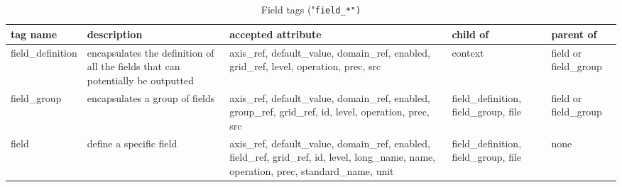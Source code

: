 \documentclass[../tex_main/NEMO_manual]{subfiles}
\begin{document}
\begin{table} \scriptsize
	\begin{tabularx}{\textwidth}{|l|X|X|X|l|} \hline
	tag name                                                                                & 
	description                                                                             & 
	accepted attribute                                                                      & 
	child of                                                                                & 
	parent of             \\ \hline \hline
	field\_definition                                                                       & 
	encapsulates the definition of all the fields that can potentially be outputted         & 
	axis\_ref, default\_value, domain\_ref, enabled, grid\_ref, level, operation, prec, src & 
	context                                                                                 & 
	field or field\_group \\ \hline
	field\_group                                                                            & 
	encapsulates a group of fields                                                          & 
	axis\_ref, default\_value, domain\_ref, enabled, group\_ref, grid\_ref,
	id, level, operation, prec, src                                                         & 
	field\_definition, field\_group, file                                                   & 
	field or field\_group \\ \hline
	field                                                                                   & 
	define a specific field                                                                 & 
	axis\_ref, default\_value, domain\_ref, enabled, field\_ref, grid\_ref,
	id, level, long\_name, name, operation, prec, standard\_name, unit                      & 
	field\_definition, field\_group, file                                                   & 
	none                  \\ \hline
	\end{tabularx}
	\caption{Field tags ("\tt{field\_*}")}
\end{table}
\end{document}
